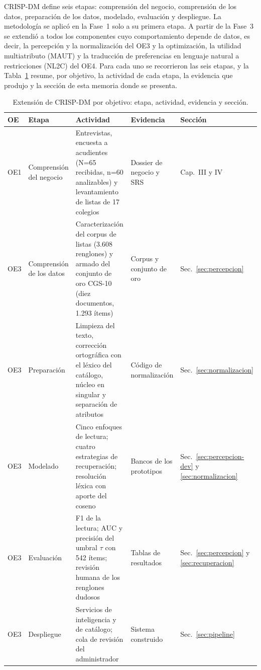 CRISP-DM \citep{chapman_crisp-dm_2000,wirth_crisp-dm_2000} define seis etapas: comprensión del
negocio, comprensión de los datos, preparación de los datos, modelado, evaluación y despliegue.
La metodología se aplicó en la Fase~1 solo a su primera etapa. A partir de la Fase~3 se extendió a
todos los componentes cuyo comportamiento depende de datos, es decir, la percepción y la
normalización del OE3 y la optimización, la utilidad multiatributo (MAUT) y la traducción de
preferencias en lenguaje natural a restricciones (NL2C) del OE4. Para cada uno se recorrieron las
seis etapas, y la Tabla~\ref{tab:crispdm-oe} resume, por objetivo, la actividad de cada etapa, la
evidencia que produjo y la sección de esta memoria donde se presenta.

\begin{table}[H]
\centering\footnotesize
\setlength{\tabcolsep}{3pt}
\renewcommand{\arraystretch}{1.1}
\caption{Extensión de CRISP-DM por objetivo: etapa, actividad, evidencia y sección.}
\label{tab:crispdm-oe}
\begin{tabularx}{\textwidth}{@{}p{0.9cm}p{2.4cm}XXp{1.9cm}@{}}
\toprule
OE & Etapa & Actividad & Evidencia & Sección \\
\midrule
OE1 & Comprensión del negocio & Entrevistas, encuesta a acudientes (N=65 recibidas, n=60
analizables) y levantamiento de listas de 17 colegios & Dossier de negocio y SRS &
Cap.~III y IV \\
\midrule
OE3 & Comprensión de los datos & Caracterización del corpus de listas (3.608 renglones) y
armado del conjunto de oro CGS-10 (diez documentos, 1.293 ítems) & Corpus y conjunto de oro &
Sec.~\ref{sec:percepcion} \\
OE3 & Preparación & Limpieza del texto, corrección ortográfica con el léxico del catálogo, núcleo
en singular y separación de atributos & Código de normalización &
Sec.~\ref{sec:normalizacion} \\
OE3 & Modelado & Cinco enfoques de lectura; cuatro estrategias de recuperación; resolución
léxica con aporte del coseno & Bancos de los prototipos &
Sec.~\ref{sec:percepcion-dev} y \ref{sec:normalizacion} \\
OE3 & Evaluación & F1 de la lectura; AUC y precisión del umbral $\tau$ con 542 ítems; revisión
humana de los renglones dudosos & Tablas de resultados &
Sec.~\ref{sec:percepcion} y \ref{sec:recuperacion} \\
OE3 & Despliegue & Servicios de inteligencia y de catálogo; cola de revisión del administrador &
Sistema construido & Sec.~\ref{sec:pipeline} \\

\end{tabularx}
\end{table}
